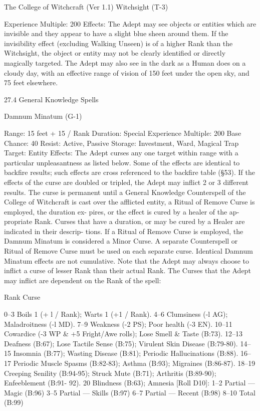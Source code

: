 \begin{Chapter}{The College of Witchcraft (Ver 1.1)}
Witchsight (T-3) 

Experience Multiple: 200 
Effects:  The  Adept  may  see  objects  or  entities 
which are invisible and they appear to have a slight 
blue  sheen  around  them.  If  the  invisibility  effect 
(excluding  Walking  Unseen)  is  of  a  higher  Rank 
than the Witchsight, the object or entity may not be 
clearly  identified  or  directly  magically  targeted. 
The  Adept  may  also  see  in  the  dark  as  a  Human 
does  on  a  cloudy  day,  with  an  effective  range  of 
vision of 150 feet under the open sky, and 75 feet 
elsewhere. 

27.4 General Knowledge Spells 

Damnum Minatum (G-1) 

Range: 15 feet + 15 / Rank 
Duration: Special 
Experience Multiple: 200 
Base Chance: 40%
Resist: Active, Passive 
Storage: Investment, Ward, Magical Trap 
Target: Entity 
Effects:  The  Adept  curses  any  one  target  within 
range  with  a  particular  unpleasantness  as  listed 
below. Some of the effects are identical to backfire 
results;  such  effects  are  cross  referenced  to  the 
backfire  table  (§53).  If  the  effects  of  the  curse  are 
doubled  or  tripled,  the  Adept  may  inflict  2  or  3 
different  results.  The  curse  is  permanent  until  a 
General Knowledge Counterspell of the College of 
Witchcraft is cast over the afflicted entity, a Ritual 
of  Remove  Curse  is  employed,  the  duration  ex-
pires,  or  the  effect  is  cured  by  a  healer  of  the  ap-
propriate Rank. Curses that have a duration, or may 
be cured by a Healer are indicated in their descrip-
tions. If a Ritual of Remove Curse is employed, the 
Damnum Minatum is considered a Minor Curse. A 
separate  Counterspell  or  Ritual  of  Remove  Curse 
must  be  used  on  each  separate  curse.  Identical 
Damnum  Minatum  effects  are  not  cumulative. 
Note that the Adept may always choose to inflict a 
curse  of  lesser  Rank  than  their  actual  Rank.  The 
Curses that the Adept may inflict are dependent on 
the Rank of the spell: 

Rank Curse 

0–3 Boils 1 (+ l / Rank); Warts 1 (+1 / Rank). 
4–6 Clumsiness (-l AG); Maladroitness (-l MD). 
7–9 Weakness (-2 PS); Poor health (-3 EN). 
10–11 Cowardice (-3 WP \& +5 Fright/Awe rolls); 
Lose Smell \& Taste (B:73). 
12–13 Deafness (B:67); Lose Tactile Sense (B:75); 
Virulent Skin Disease (B:79-80). 
14–15 Insomnia (B:77); Wasting Disease (B:81); 
Periodic Hallucinations (B:88). 
16–17 Periodic Muscle Spasms (B:82-83); Asthma 
(B:93); Migraines (B:86-87). 
18–19 Creeping Senility (B:94-95); Struck Mute 
(B:71); Arthritis (B:89-90); Enfeeblement (B:91-
92). 
20 Blindness (B:63); 
Amnesia [Roll D10]: 
 1–2 Partial — Magic (B:96) 
 3–5 Partial — Skills (B:97) 
 6–7 Partial — Recent (B:98) 
 8–10 Total (B:99) 


\end{Chapter}
